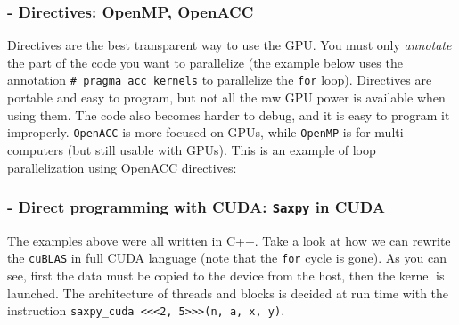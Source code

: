 \subsubsection{- Directives: OpenMP, OpenACC}

Directives are the best transparent way to use the GPU. You must only \textit{annotate} the part of the code you want to parallelize (the example below uses the annotation \texttt{\# pragma acc kernels} to parallelize the \texttt{for} loop). Directives are portable and easy to program, but not all the raw GPU power is available when using them. The code also becomes harder to debug, and it is easy to program it improperly. \texttt{OpenACC} is more focused on GPUs, while \texttt{OpenMP} is for multi-computers (but still usable with GPUs). This is an example of loop parallelization using OpenACC directives:

\subsubsection{- Direct programming with CUDA: \texttt{Saxpy} in CUDA}

The examples above were all written in C++. Take a look at how we can rewrite the \texttt{cuBLAS} in full CUDA language (note that the \texttt{for} cycle is gone). As you can see, first the data must be copied to the device from the host, then the kernel is launched. The architecture of threads and blocks is decided at run time with the instruction \texttt{saxpy\_cuda <<<2, 5>>>(n, a, x, y)}.

